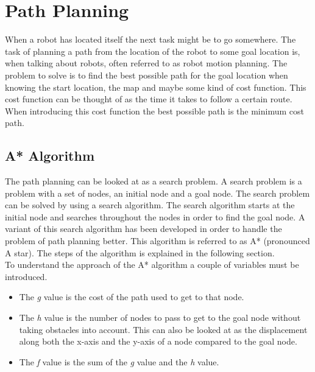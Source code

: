 
\section{Path Planning} %
\label{sec:path_planning}

When a robot has located itself the next task might be to go somewhere. The task of planning a path from the location of the robot to some goal location is, when talking about robots, often referred to as robot motion planning. The problem to solve is to find the best possible path for the goal location when knowing the start location, the map and maybe some kind of cost function. This cost function can be thought of as the time it takes to follow a certain route. When introducing this cost function the best possible path is the minimum cost path. \\

\subsection{A* Algorithm} %
\label{sub:a_algorithm}

The path planning can be looked at as a search problem. A search problem is a problem with a set of nodes, an initial node and a goal node. The search problem can be solved by using a search algorithm. The search algorithm starts at the initial node and searches throughout the nodes in order to find the goal node. A variant of this search algorithm has been developed in order to handle the problem of path planning better. This algorithm is referred to as A* (pronounced A star). The steps of the algorithm is explained in the following section. \\

To understand the approach of the A* algorithm a couple of variables must be introduced.

\begin{itemize}
	\item The \emph{g} value is the cost of the path used to get to that node.

	\item The \emph{h} value is the number of nodes to pass to get to the goal node without taking obstacles into account. This can also be looked at as the displacement along both the x-axis and the y-axis of a node compared to the goal node.

	\item The \emph{f} value is the sum of the \emph{g} value and the \emph{h} value.\\
\end{itemize}

